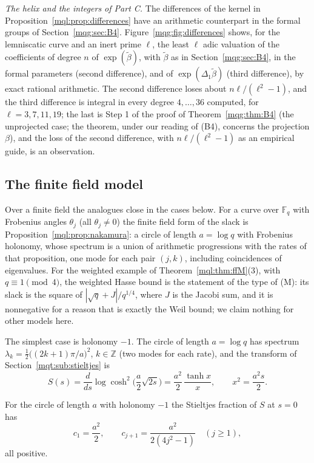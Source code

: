 \emph{The helix and the integers of Part C.} The differences of the kernel in Proposition~\ref{mql:prop:differences} have an arithmetic counterpart in the formal groups of Section~\ref{mqg:sec:B4}. Figure~\ref{mqg:fig:differences} shows, for the lemniscatic curve and an inert prime $\ell$, the least $\ell$ adic valuation of the coefficients of degree $n$ of $\exp(\tilde\beta)$, with $\tilde\beta$ as in Section~\ref{mqg:sec:B4}, in the formal parameters (second difference), and of $\exp(\Delta_1\tilde\beta)$ (third difference), by exact rational arithmetic. The second difference loses about $n\ell/(\ell^2-1)$, and the third difference is integral in every degree $4,\dots,36$ computed, for $\ell=3,7,11,19$; the last is Step 1 of the proof of Theorem~\ref{mqg:thm:B4} (the unprojected case; the theorem, under our reading of (B4), concerns the projection $\beta$), and the loss of the second difference, with $n\ell/(\ell^2-1)$ as an empirical guide, is an observation.

\subsection{The finite field model}\label{mqt:sub:ff}

Over a finite field the analogues close in the cases below. For a curve over $\mathbb F_q$ with Frobenius angles $\theta_j$ (all $\theta_j\ne0$) the finite field form of the slack is Proposition~\ref{mql:prop:nakamura}: a circle of length $a=\log q$ with Frobenius holonomy, whose spectrum is a union of arithmetic progressions with the rates of that proposition, one mode for each pair $(j,k)$, including coincidences of eigenvalues. For the weighted example of Theorem~\ref{mql:thm:ffM}(3), with $q\equiv1\pmod4$, the weighted Hasse bound is the statement of the type of (M): its slack is the square of $|\sqrt q+J|/q^{1/4}$, where $J$ is the Jacobi sum, and it is nonnegative for a reason that is exactly the Weil bound; we claim nothing for other models here.

The simplest case is holonomy $-1$. The circle of length $a=\log q$ has spectrum $\lambda_k=\frac12\big((2k+1)\pi/a\big)^2$, $k\in\mathbb Z$ (two modes for each rate), and the transform of Section~\ref{mqt:sub:stieltjes} is
\[
S(s)=\frac d{ds}\log\cosh^2\Big(\frac a2\sqrt{2s}\Big)=\frac{a^2}2\,\frac{\tanh x}x,\qquad x^2=\frac{a^2s}2.
\]
\begin{proposition}\label{mqt:prop:lambert}
For the circle of length $a$ with holonomy $-1$ the Stieltjes fraction of $S$ at $s=0$ has
\[
c_1=\frac{a^2}2,\qquad c_{j+1}=\frac{a^2}{2(4j^2-1)}\quad(j\ge1),
\]
all positive.
\end{proposition}


